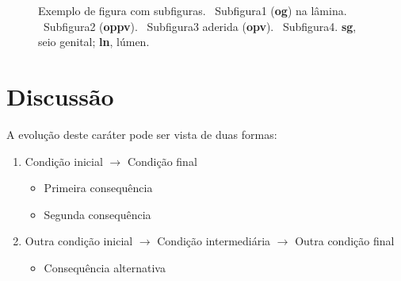 \begin{figure}[htbp]
    \caption[Figura com subfiguras]{Exemplo de figura com subfiguras. ~Subfigura1 (\textbf{og}) na lâmina. ~Subfigura2 (\textbf{oppv}). ~Subfigura3 aderida (\textbf{opv}). ~Subfigura4. \textbf{sg}, seio genital; \textbf{ln}, lúmen.}%
    \label{fig:fsm}
\end{figure}

\section{Discussão}\label{cap2:disc}

A evolução deste caráter pode ser vista de duas formas:

\begin{enumerate}
  \item{Condição inicial $\longrightarrow$ Condição final}\label{hipo:1}
    \begin{itemize}
      \item{Primeira consequência}
      \item{Segunda consequência}
    \end{itemize}
  \item{Outra condição inicial $\longrightarrow$ Condição intermediária $\longrightarrow$ Outra condição final}\label{hipo:2}
    \begin{itemize}
      \item{Consequência alternativa}
    \end{itemize}
\end{enumerate}

